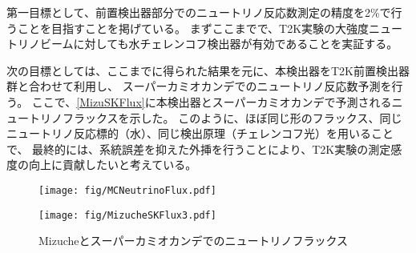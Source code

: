 第一目標として、前置検出器部分でのニュートリノ反応数測定の精度を2\%で行うことを目指すことを掲げている。
まずここまでで、T2K実験の大強度ニュートリノビームに対しても水チェレンコフ検出器が有効であることを実証する。

次の目標としては、ここまでに得られた結果を元に、本検出器をT2K前置検出器群と合わせて利用し、
スーパーカミオカンデでのニュートリノ反応数予測を行う。
ここで、\autoref{MizuSKFlux}に本検出器とスーパーカミオカンデで予測されるニュートリノフラックスを示した。
このように、ほぼ同じ形のフラックス、同じニュートリノ反応標的（水）、同じ検出原理（チェレンコフ光）を用いることで、
最終的には、系統誤差を抑えた外挿を行うことにより、T2K実験の測定感度の向上に貢献したいと考えている。

\begin{figure}[htbp]
  \begin{minipage}{0.47\textwidth}
    \centering
    \texttt{[image: fig/MCNeutrinoFlux.pdf]}
    \label{MizuFlux}
  \end{minipage}
  \hfill
  \begin{minipage}{0.47\textwidth}
    \centering
    \texttt{[image: fig/MizucheSKFlux3.pdf]}
    \label{SKFlux}
  \end{minipage}
  \caption[Mizucheとスーパーカミオカンデでのニュートリノフラックス]{Mizucheとスーパーカミオカンデでのニュートリノフラックス}
  \label{MizuSKFlux}
\end{figure}




